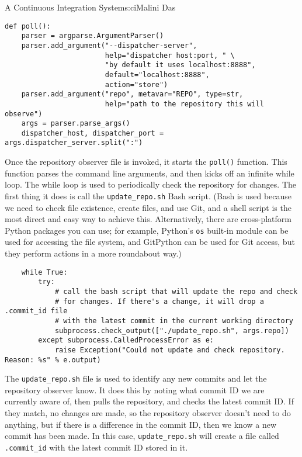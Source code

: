 \begin{aosachapter}{A Continuous Integration System}{s:ci}{Malini Das}
\begin{verbatim}
def poll():
    parser = argparse.ArgumentParser()
    parser.add_argument("--dispatcher-server",
                        help="dispatcher host:port, " \
                        "by default it uses localhost:8888",
                        default="localhost:8888",
                        action="store")
    parser.add_argument("repo", metavar="REPO", type=str,
                        help="path to the repository this will observe")
    args = parser.parse_args()
    dispatcher_host, dispatcher_port = args.dispatcher_server.split(":")
\end{verbatim}

Once the repository observer file is invoked, it starts the
\texttt{poll()} function. This function parses the command line
arguments, and then kicks off an infinite while loop. The while loop is
used to periodically check the repository for changes. The first thing
it does is call the \texttt{update\_repo.sh} Bash script. (Bash is used
because we need to check file existence, create files, and use Git, and
a shell script is the most direct and easy way to achieve this.
Alternatively, there are cross-platform Python packages you can use; for
example, Python's \texttt{os} built-in module can be used for accessing
the file system, and GitPython can be used for Git access, but they
perform actions in a more roundabout way.)

\begin{verbatim}
    while True:
        try:
            # call the bash script that will update the repo and check
            # for changes. If there's a change, it will drop a .commit_id file
            # with the latest commit in the current working directory
            subprocess.check_output(["./update_repo.sh", args.repo])
        except subprocess.CalledProcessError as e:
            raise Exception("Could not update and check repository. Reason: %s" % e.output)
\end{verbatim}

The \texttt{update\_repo.sh} file is used to identify any new commits
and let the repository observer know. It does this by noting what commit
ID we are currently aware of, then pulls the repository, and checks the
latest commit ID. If they match, no changes are made, so the repository
observer doesn't need to do anything, but if there is a difference in
the commit ID, then we know a new commit has been made. In this case,
\texttt{update\_repo.sh} will create a file called \texttt{.commit\_id}
with the latest commit ID stored in it.


\end{aosachapter}
